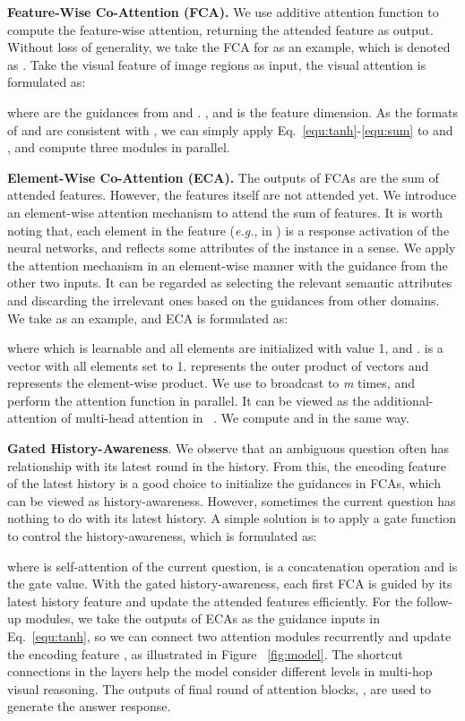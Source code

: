 \documentclass[10pt,twocolumn,letterpaper]{article}
\begin{document}
\noindent\textbf{Feature-Wise Co-Attention (FCA).} We use additive attention function to compute the feature-wise attention, returning the attended feature as output. Without loss of generality, we take the FCA for  as an example, which is denoted as . Take the visual feature of image regions  as input, the visual attention is formulated as: 




where  are the guidances from  and . ,  and  is the feature dimension. As the formats of  and  are consistent with , we can simply apply Eq.~\eqref{equ:tanh}-\eqref{equ:sum} to  and , and compute three modules in parallel.

\noindent\textbf{Element-Wise Co-Attention (ECA).} The outputs of FCAs are the sum of attended features. However, the features itself are not attended yet. We introduce an element-wise attention mechanism to attend the sum of features. It is worth noting that, each element in the feature (\emph{e.g.},  in ) is a response activation of the neural networks, and reflects some attributes of the instance in a sense. We apply the attention mechanism in an element-wise manner with the guidance from the other two inputs. It can be regarded as selecting the relevant semantic attributes and discarding the irrelevant ones based on the guidances from other domains. We take  as an example, and ECA is formulated as:

 
 
 where  which is learnable and all elements are initialized with value 1,  and .  is a vector with all elements set to 1.  represents the outer product of vectors and  represents the element-wise product. We use  to broadcast  to \emph{m} times, and perform the attention function in parallel. It can be viewed as the additional-attention of multi-head attention in ~\cite{vaswani2017attention}.
 We compute  and  in the same way.
 
\noindent\textbf{Gated History-Awareness}. We observe that an ambiguous question often has relationship with its latest round in the history. From this, the encoding feature of the latest history  is a good choice to initialize the guidances in FCAs, which can be viewed as history-awareness. However, sometimes the current question has nothing to do with its latest history. A simple solution is to apply a gate function to control the history-awareness, which is formulated as:




 where  is self-attention of the current question,  is a concatenation operation and  is the gate value. With the gated history-awareness, each first FCA is guided by its latest history feature and update the attended features efficiently. For the follow-up modules, we take the outputs of ECAs as the guidance inputs in Eq.~\eqref{equ:tanh}, so we can connect two attention modules recurrently and update the encoding feature , as illustrated in Figure ~\ref{fig:model}. The shortcut connections in the layers help the model consider different levels in multi-hop visual reasoning. The outputs of final round of attention blocks, , are used to generate the answer response.
\end{document}
